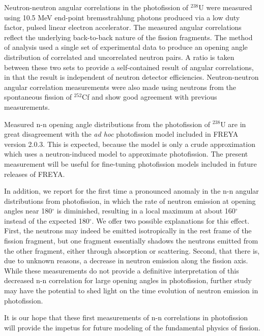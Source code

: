 Neutron-neutron angular correlations in the photofission of $^{238}$U were measured using 10.5 MeV end-point bremsstrahlung photons produced via a low duty factor, pulsed linear electron accelerator.
The measured angular correlations reflect the underlying back-to-back nature of the fission fragments.
The method of analysis used a single set of experimental data to produce an opening angle distribution of correlated and uncorrelated neutron pairs.
A ratio is taken between these two sets to provide a self-contained result of angular correlations, in that the result is independent of neutron detector efficiencies.
Neutron-neutron angular correlation measurements were also made using neutrons from the spontaneous fission of $^{252}$Cf and show good agreement with previous measurements.

Measured n-n opening angle distributions from the photofission of $^{238}$U are in great disagreement with the \textit{ad hoc} photofission model included in FREYA version 2.0.3.
This is expected, because the model is only a crude approximation which uses a neutron-induced model to approximate photofission.
The present measurement will be useful for fine-tuning photofission models included in future releases of FREYA.

In addition, we report for the first time a pronounced anomaly in the n-n angular distributions from photofission, in which the rate of neutron emission at opening angles near 180$^{\circ}$ is diminished, resulting in a local maximum at about 160$^{\circ}$ instead of the expected 180$^{\circ}$.
We offer two possible explanations for this effect.
First, the neutrons may indeed be emitted isotropically in the rest frame of the fission fragment, but one fragment essentially shadows the neutrons emitted from the other fragment, either through absorption or scattering.
Second, that there is, due to unknown reasons, a decrease in neutron emission along the fission axis.
While these measurements do not provide a definitive interpretation of this decreased n-n correlation for large opening angles in photofission, further study may have the potential to shed light on the time evolution of neutron emission in photofission.

It is our hope that these first measurements of n-n correlations in photofission will provide the impetus for future modeling of the fundamental physics of fission.

